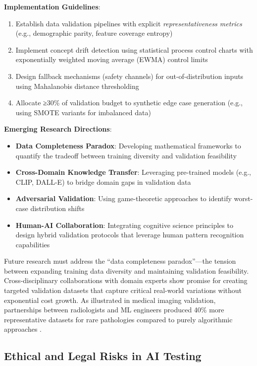 \documentclass[manuscript,screen,review]{acmart}
\begin{document}
\textbf{Implementation Guidelines}:
\begin{enumerate}
    \item Establish data validation pipelines with explicit \textit{representativeness metrics} (e.g., demographic parity, feature coverage entropy)
    \item Implement concept drift detection using statistical process control charts with exponentially weighted moving average (EWMA) control limits
    \item Design fallback mechanisms (safety channels) for out-of-distribution inputs using Mahalanobis distance thresholding
    \item Allocate ≥30\% of validation budget to synthetic edge case generation (e.g., using SMOTE variants for imbalanced data)
\end{enumerate}

\textbf{Emerging Research Directions}:
\begin{itemize}
    \item \textbf{Data Completeness Paradox}: Developing mathematical frameworks to quantify the tradeoff between training diversity and validation feasibility
    \item \textbf{Cross-Domain Knowledge Transfer}: Leveraging pre-trained models (e.g., CLIP, DALL-E) to bridge domain gaps in validation data
    \item \textbf{Adversarial Validation}: Using game-theoretic approaches to identify worst-case distribution shifts
    \item \textbf{Human-AI Collaboration}: Integrating cognitive science principles to design hybrid validation protocols that leverage human pattern recognition capabilities
\end{itemize}

Future research must address the ``data completeness paradox''---the tension between expanding training data diversity and maintaining validation feasibility. Cross-disciplinary collaborations with domain experts show promise for creating targeted validation datasets that capture critical real-world variations without exponential cost growth. As illustrated in medical imaging validation, partnerships between radiologists and ML engineers produced 40\% more representative datasets for rare pathologies compared to purely algorithmic approaches .

\subsection{Ethical and Legal Risks in AI Testing}
\end{document}
